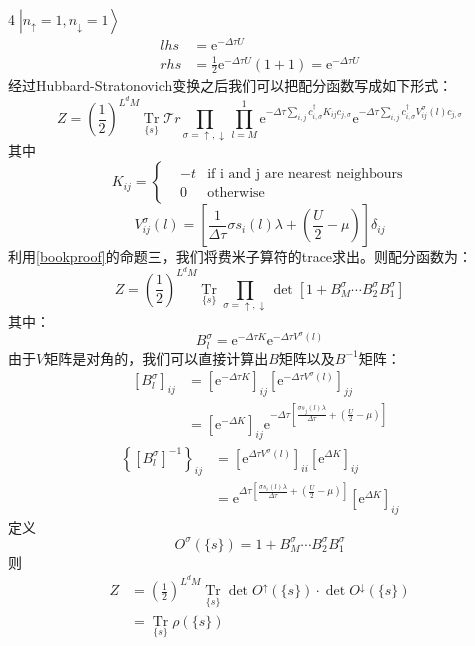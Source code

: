 \documentclass[UTF8,cs4size]{ctexart}
\def\ee{\mathrm e}
\begin{document}
\textcircled{4}$\left| n_{\uparrow}=1,n_{\downarrow}=1 \right>$
\[
    \begin{aligned}
        lhs&=\ee^{-\Delta \tau U}\\
        rhs&=\frac{1}{2}\ee^{-\Delta \tau U}\left(1+1\right) = \ee^{-\Delta \tau U}
    \end{aligned}    
\]
经过Hubbard-Stratonovich变换之后我们可以把配分函数写成如下形式：
\[
    Z=\left( \frac{1}{2}\right)^{L^d M} \mathop{\mathrm{Tr}} \limits_{\{s\}} \mathcal{T}r
    \prod_{\sigma=\uparrow , \downarrow} \prod_{l=M}^{1} 
    \ee^{-\Delta \tau \sum_{i,j} c^{\dag}_{i,\sigma} K_{ij} c_{j,\sigma}}
    \ee^{-\Delta \tau \sum_{i,j} c^{\dag}_{i,\sigma} V^{\sigma}_{ij}(l) c_{j,\sigma}}
\]
其中
\[
    K_{ij}=
    \left\{
        \begin{aligned}
            &-t &\text{if i and j are nearest neighbours}\\
            &0  &\text{otherwise}
        \end{aligned}
    \right.   
\]
\[
    V^{\sigma}_{ij}(l)=\left[\frac{1}{\Delta \tau} \sigma s_{i}(l) \lambda 
        +\left(\frac{U}{2} - \mu\right) \right] \delta_{ij}
\]
利用\ref{bookproof}的命题三，我们将费米子算符的trace求出。则配分函数为：
\[
    Z=\left( \frac{1}{2}\right)^{L^d M} \mathop{\mathrm{Tr}} \limits_{\{s\}}
    \prod_{\sigma=\uparrow , \downarrow}
    \det\left[1+B^{\sigma}_{M} \cdots B^{\sigma}_{2} B^{\sigma}_{1} \right]
\]
其中：
\[
    B^{\sigma}_{l}=\ee^{-\Delta \tau K} \ee^{-\Delta \tau V^{\sigma}(l)}
\]
由于$V$矩阵是对角的，我们可以直接计算出$B$矩阵以及$B^{-1}$矩阵：
\[
    \begin{aligned}
        \left[B ^ {\sigma}_{l}\right]_{ij} &= [\ee^{-\Delta \tau K}]_{ij}[\ee^{-\Delta \tau V^{\sigma}(l)}]_{jj}\\
        &= [\ee^{-\Delta K}]_{ij} \ee^{-\Delta \tau
            \left[\frac{\sigma s_{j}(l)\lambda}{\Delta \tau} + \left(\frac{U}{2} -\mu \right)\right]}
    \end{aligned}
\]
\[
    \begin{aligned}
        \left\{\left[B ^ {\sigma}_{l}\right]^{-1}\right\}_{ij} &=
            [\ee^{\Delta \tau V^{\sigma} (l)}]_{ii} [\ee^{\Delta K}]_{ij} \\
        &=  \ee^{\Delta \tau
        \left[\frac{\sigma s_{i}(l)\lambda}{\Delta \tau} + \left(\frac{U}{2} -\mu \right)\right]}
        [\ee^{\Delta K}]_{ij}
    \end{aligned}  
\]
定义
\[
    O^{\sigma}(\{s\})= 1+ B^{\sigma}_{M} \cdots B^{\sigma}_{2} B^{\sigma}_{1}
\]
则
\[
    \begin{aligned}
    Z&=\left( \frac{1}{2}\right)^{L^d M} \mathop{\mathrm{Tr}} \limits_{\{s\}}
    \det O^{\uparrow}(\{s\}) \cdot \det O^{\downarrow} (\{s\})\\
    &= \mathop{\mathrm{Tr}} \limits_{\{s\}} \rho (\{s\})
    \end{aligned}
\]
\end{document}
